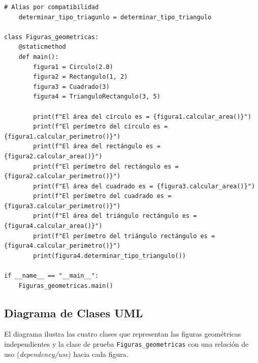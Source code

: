 \documentclass[11pt,a4paper]{article}
\begin{document}
\begin{lstlisting}[caption={Implementación de Figuras Geométricas (\texttt{Actividad2\_Ejercicio2\_4\_Figuras.py})}]
    # Alias por compatibilidad
    determinar_tipo_triagunlo = determinar_tipo_triangulo

class Figuras_geometricas:
    @staticmethod
    def main():
        figura1 = Circulo(2.0)
        figura2 = Rectangulo(1, 2)
        figura3 = Cuadrado(3)
        figura4 = TrianguloRectangulo(3, 5)

        print(f"El área del círculo es = {figura1.calcular_area()}")
        print(f"El perímetro del círculo es = {figura1.calcular_perimetro()}")
        print(f"El área del rectángulo es = {figura2.calcular_area()}")
        print(f"El perímetro del rectángulo es = {figura2.calcular_perimetro()}")
        print(f"El área del cuadrado es = {figura3.calcular_area()}")
        print(f"El perímetro del cuadrado es = {figura3.calcular_perimetro()}")
        print(f"El área del triángulo rectángulo es = {figura4.calcular_area()}")
        print(f"El perímetro del triángulo rectángulo es = {figura4.calcular_perimetro()}")
        print(figura4.determinar_tipo_triangulo())

if __name__ == "__main__":
    Figuras_geometricas.main()
\end{lstlisting}

\subsection{Diagrama de Clases UML}
El diagrama ilustra las cuatro clases que representan las figuras geométricas independientes y la clase de prueba \texttt{Figuras\_geometricas} con una relación de uso (\textit{dependency/use}) hacia cada figura.
\end{document}
